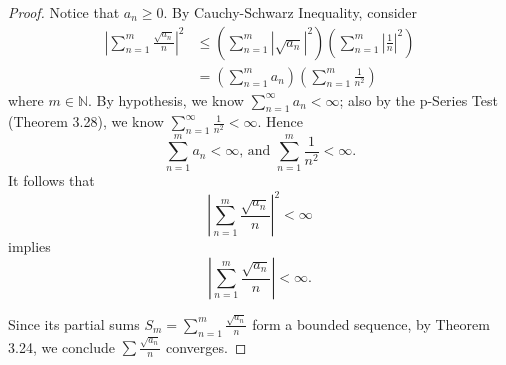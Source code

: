 \begin{Exercise}
\begin{proof}
Notice that $a_n\geq 0$. By Cauchy-Schwarz Inequality, consider
\begin{align*}
\left| \sum_{n=1}^{m} \frac{\sqrt{a_n}}{n} \right|^2
&\leq 
\left( \sum_{n=1}^{m} \left| \sqrt{a_n} \right|^2 \right)
\left( \sum_{n=1}^{m} \left| \frac{1}{n} \right|^2 \right) \\
&= \left( \sum_{n=1}^{m} a_n \right) \left( \sum_{n=1}^{m} \frac{1}{n^2} \right)
\end{align*}
where $m\in\mathbb{N}$. By hypothesis, we know $\sum_{n=1}^{\infty} a_n < \infty$; also by the p-Series Test (Theorem 3.28), we know $\sum_{n=1}^{\infty} \frac{1}{n^2} < \infty$. Hence 
$$
\sum_{n=1}^{m} a_n<\infty\text{, and }\sum_{n=1}^{m} \frac{1}{n^2} < \infty.
$$
It follows that
$$
\left| \sum_{n=1}^{m} \frac{\sqrt{a_n}}{n} \right|^2 < \infty
$$
implies
$$
\left| \sum_{n=1}^{m} \frac{\sqrt{a_n}}{n} \right| < \infty.
$$

Since its partial sums $S_m = \sum_{n=1}^{m} \frac{\sqrt{a_n}}{n}$ form a bounded sequence, by Theorem 3.24, we conclude $\sum \frac{\sqrt{a_n}}{n}$ converges.
\end{proof}
\end{Exercise}